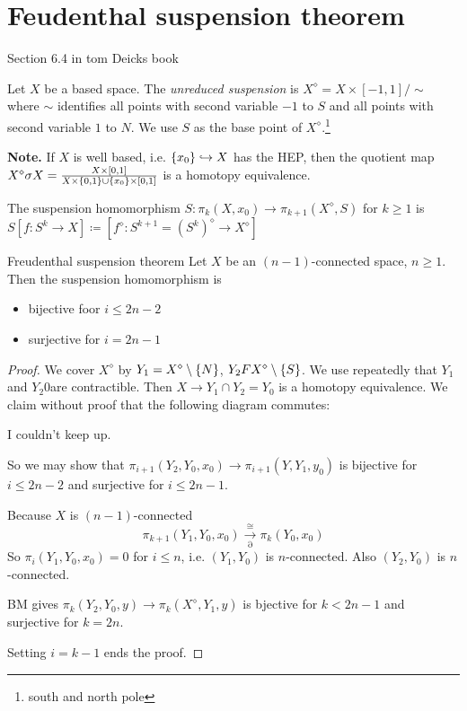 \documentclass[language=english]{TemplateLecture}
\begin{document}
\section{Feudenthal suspension theorem}
Section 6.4 in tom Deicks book

\begin{defi}{}{}
    Let \(X\) be a based space. The \emph{unreduced suspension} is \(X^\diamond = X\times [-1,1]/\sim\) where \(\sim\) identifies all points with second variable \(-1\) to \(S\) and all points with second variable \(1\) to \(N\). We use \(S\) as the base point of \(X^\diamond\).\footnote{south and north pole}
\end{defi}

\textbf{Note.} If \(X\) is well based, i.e. \(\{x_0\} \hookrightarrow X\) has the HEP, then the quotient map \(X^\diamond \sigma X = \frac{X\times [0,1]}{X\times \{0,1\}\cup \{x_0\}\times [0,1]}\) is a homotopy equivalence.

The suspension homomorphism \(S\colon \pi_k(X,x_0) \to \pi_{k+1}(X^\diamond, S)\) for \(k \geq 1\) is \(S[f\colon S^k \to X] \coloneq [f^\diamond \colon S^{k+1}= (S^k)^\diamond \to X^\diamond]\)

\begin{thm}{Freudenthal suspension theorem}{}
    Let \(X\) be an \((n-1)\)-connected space, \(n \geq 1\). Then the suspension homomorphism is \begin{itemize}
        \item bijective foor \(i\leq 2n-2\)
        \item surjective for \(i = 2n-1\)
    \end{itemize}
\end{thm}

\begin{proof}
    We cover \(X^\diamond\) by \(Y_1 = X^\diamond \setminus \{N\}\), \(Y_2 F X^\diamond \setminus \{S\}\). We use repeatedly that \(Y_1\) and \(Y_2\)0are contractible. Then \(X\to Y_1\cap Y_2 = Y_0\) is a homotopy equivalence. We claim without proof that the following diagram commutes:

    I couldn't keep up.

    So we may show that \(\pi_{i+1} (Y_2, Y_0, x_0)\to \pi_{i+1}(Y, Y_1, y_0)\) is bijective for \(i \leq 2n-2\) and surjective for \(i \leq 2n-1\).

    Because \(X\) is \((n-1)\)-connected
    \[\pi_{k+1}(Y_1, Y_0, x_0) \xrightarrow[\partial]{\cong} \pi_k(Y_0, x_0)\]
    So \(\pi_i(Y_1, Y_0, x_0) = 0\) for \(i \leq n\), i.e. \((Y_1, Y_0)\) is \(n\)-connected. Also \((Y_2, Y_0)\) is \(n\)-connected.

    BM gives \(\pi_k(Y_2, Y_0, y) \to \pi_k(X^\diamond, Y_1, y)\) is bjective for \(k < 2n-1\) and surjective for \(k = 2n\).

    Setting \(i = k-1\) ends the proof.
\end{proof}
\end{document}
